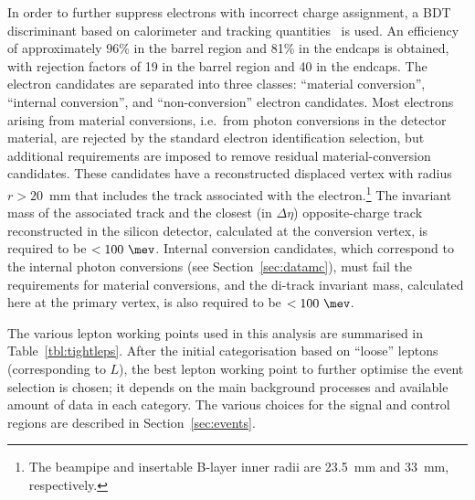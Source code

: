 \documentclass[cernpreprint, atlasdraft=false, texlive=2023, UKenglish, texmf, orcidlogo]{atlasdoc}
\begin{document}
In order to further suppress electrons with incorrect charge assignment, a BDT discriminant based on calorimeter and tracking quantities~\cite{PERF-2017-01} is used. 
An efficiency of approximately 96\% in the barrel region and 81\% in the endcaps is obtained, with rejection factors of 19 in the barrel region and 40 in the endcaps.
The electron candidates are separated into three classes: \enquote{material conversion}, \enquote{internal conversion}, and \enquote{non-conversion} electron candidates.
Most electrons arising from material conversions, i.e.\ from photon conversions in the detector material, are rejected by the standard electron identification selection, but additional requirements are imposed to remove residual material-conversion candidates.
These candidates have a reconstructed displaced vertex with radius $r > 20$~mm that includes the track associated with the electron.\footnote{The beampipe and insertable B-layer inner radii are 23.5~mm and 33~mm, respectively.} The invariant mass of the associated track and the closest (in $\Delta\eta$) opposite-charge track reconstructed in the silicon detector, calculated at the conversion vertex, is required to be $<100~\mev$. Internal conversion candidates, which correspond to the internal photon conversions (see Section~\ref{sec:datamc}), must fail the requirements for material conversions, and the di-track invariant mass, calculated here at the primary vertex, is also required to be $<100~\mev$.
 
The various lepton working points used in this analysis are summarised in Table~\ref{tbl:tightleps}. After the initial categorisation based on \enquote{loose} leptons (corresponding to $L$), the best lepton working point to further optimise the event selection is chosen; it depends on the main background processes and available amount of data in each category. The various choices for the signal and control regions are described in Section~\ref{sec:events}.
 
\end{document}
